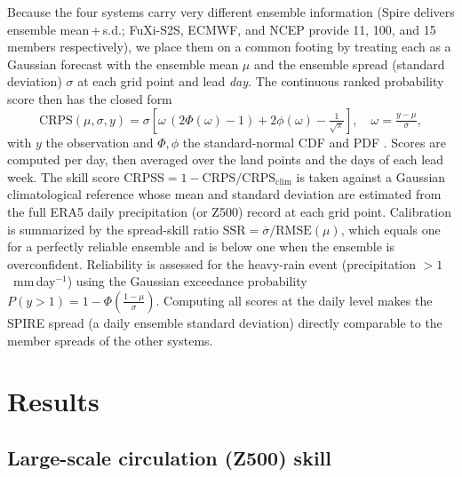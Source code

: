 \documentclass[11pt]{article}
\begin{document}
Because the four systems carry very different ensemble information
(Spire delivers ensemble mean\,+\,s.d.; FuXi-S2S, ECMWF, and NCEP
provide 11, 100, and 15 members respectively), we place them on a common
footing by treating each as a Gaussian forecast with the ensemble mean
$\mu$ and the ensemble spread (standard deviation) $\sigma$ at each grid
point and lead
\emph{day}. The continuous ranked probability score then has the
closed form
\begin{equation}
  \mathrm{CRPS}(\mu,\sigma,y) = \sigma\!\left[\omega\,(2\Phi(\omega)-1)
  + 2\phi(\omega) - \tfrac{1}{\sqrt{\pi}}\right],\quad \omega=\tfrac{y-\mu}{\sigma},
  \label{eq:crps}
\end{equation}
with $y$ the observation and $\Phi,\phi$ the standard-normal CDF and PDF
\citep{gneiting2007}. Scores are computed per day, then averaged over the
land points and the days of each lead week. The skill score
$\mathrm{CRPSS}=1-\mathrm{CRPS}/\mathrm{CRPS}_{\mathrm{clim}}$ is taken
against a Gaussian climatological reference whose mean and standard
deviation are estimated from the full ERA5 daily precipitation (or Z500)
record at each grid point. Calibration is summarized by the spread-skill
ratio $\mathrm{SSR}=\overline{\sigma}/\mathrm{RMSE}(\mu)$, which equals
one for a perfectly reliable ensemble and is below one when the ensemble
is overconfident. Reliability is assessed for the heavy-rain event
(precipitation $>1$~mm\,day$^{-1}$) using the Gaussian exceedance
probability $P(y>1)=1-\Phi\!\left(\tfrac{1-\mu}{\sigma}\right)$.
Computing all scores at the daily level makes the SPIRE spread (a daily
ensemble standard deviation) directly comparable to the member spreads of
the other systems.

\section{Results}\label{sec:results}

\subsection{Large-scale circulation (Z500) skill}\label{sec:lead_skill}
\end{document}

